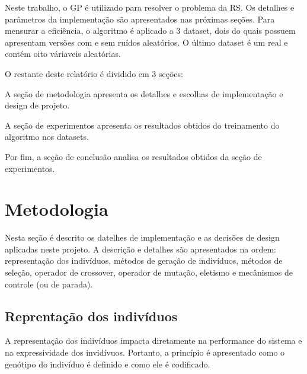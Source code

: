 \documentclass[a4paper]{paper}
\begin{document}
\begin{center}
\end{center}

Neste trabalho, o GP é utilizado para resolver o problema da RS. Os detalhes e
parâmetros da implementação são apresentados nas próximas seções. Para mensurar
a eficiência, o algoritmo é aplicado a 3 dataset, dois do quais possuem
apresentam versões com e sem ruídos aleatórios. O último dataset é um real e
contém oito váriaveis aleatórias.

O restante deste relatório é dividido em 3 seções: 
\begin{ilist}
\item A seção de metodologia apresenta os detalhes e escolhas de implementação
  e design de projeto.
\item A seção de experimentos apresenta os resultados obtidos do treinamento
  do algoritmo nos datasets.
\item Por fim, a seção de conclusão analisa os resultados obtidos da seção de
  experimentos.
\end{ilist}

\section{Metodologia}
Nesta seção é descrito os datelhes de implementação e as decisões de design
aplicadas neste projeto. A descrição e detalhes são apresentados na ordem:
representação dos indivíduos, métodos de geração de indivíduos, métodos de
seleção, operador de crossover, operador de mutação, eletismo e mecânismos de
controle (ou de parada).

\subsection{Reprentação dos indivíduos}
A representação dos indivíduos impacta diretamente na performance do sistema e
na expressividade dos invidívuos. Portanto, a princípio é apresentado como o
genótipo do indivíduo é definido e como ele é codificado.
\end{document}
